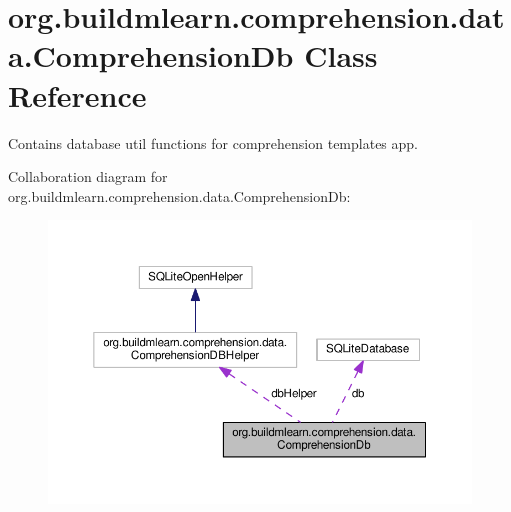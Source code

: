 \hypertarget{classorg_1_1buildmlearn_1_1comprehension_1_1data_1_1ComprehensionDb}{}\section{org.\+buildmlearn.\+comprehension.\+data.\+Comprehension\+Db Class Reference}
\label{classorg_1_1buildmlearn_1_1comprehension_1_1data_1_1ComprehensionDb}


Contains database util functions for comprehension template\textquotesingle{}s app.  




Collaboration diagram for org.\+buildmlearn.\+comprehension.\+data.\+Comprehension\+Db\+:
\nopagebreak
\begin{figure}[H]
\begin{center}
\leavevmode
\includegraphics[width=350pt]{classorg_1_1buildmlearn_1_1comprehension_1_1data_1_1ComprehensionDb__coll__graph}
\end{center}
\end{figure}
